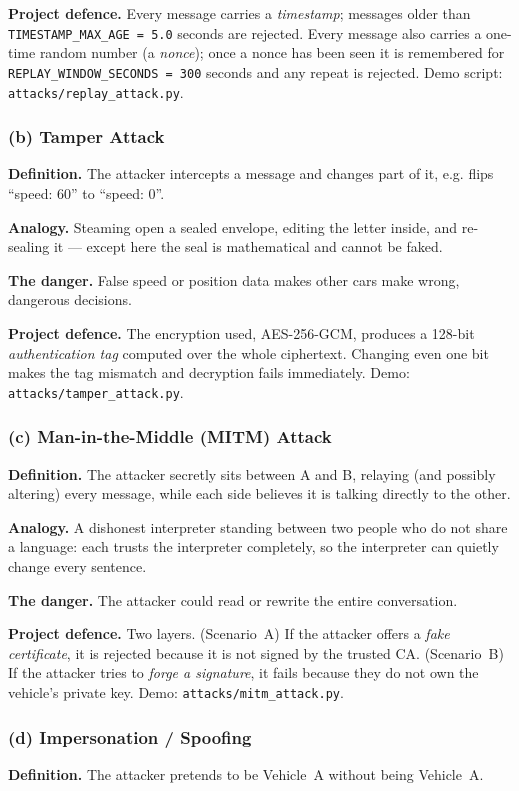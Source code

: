 \documentclass[11pt,a4paper]{report}
\begin{document}
\textbf{Project defence.} Every message carries a \emph{timestamp}; messages
older than \texttt{TIMESTAMP\_MAX\_AGE = 5.0} seconds are rejected. Every message
also carries a one-time random number (a \emph{nonce}); once a nonce has been
seen it is remembered for \texttt{REPLAY\_WINDOW\_SECONDS = 300} seconds and any
repeat is rejected. Demo script: \texttt{attacks/replay\_attack.py}.

\subsubsection*{(b) Tamper Attack}
\textbf{Definition.} The attacker intercepts a message and changes part of it,
e.g. flips ``speed: 60'' to ``speed: 0''.

\textbf{Analogy.} Steaming open a sealed envelope, editing the letter inside,
and re-sealing it --- except here the seal is mathematical and cannot be faked.

\textbf{The danger.} False speed or position data makes other cars make wrong,
dangerous decisions.

\textbf{Project defence.} The encryption used, AES-256-GCM, produces a 128-bit
\emph{authentication tag} computed over the whole ciphertext. Changing even one
bit makes the tag mismatch and decryption fails immediately. Demo:
\texttt{attacks/tamper\_attack.py}.

\subsubsection*{(c) Man-in-the-Middle (MITM) Attack}
\textbf{Definition.} The attacker secretly sits between A and B, relaying (and
possibly altering) every message, while each side believes it is talking
directly to the other.

\textbf{Analogy.} A dishonest interpreter standing between two people who do not
share a language: each trusts the interpreter completely, so the interpreter can
quietly change every sentence.

\textbf{The danger.} The attacker could read or rewrite the entire conversation.

\textbf{Project defence.} Two layers. (Scenario~A) If the attacker offers a
\emph{fake certificate}, it is rejected because it is not signed by the trusted
CA. (Scenario~B) If the attacker tries to \emph{forge a signature}, it fails
because they do not own the vehicle's private key. Demo:
\texttt{attacks/mitm\_attack.py}.

\subsubsection*{(d) Impersonation / Spoofing}
\textbf{Definition.} The attacker pretends to be Vehicle~A without being
Vehicle~A.
\end{document}
